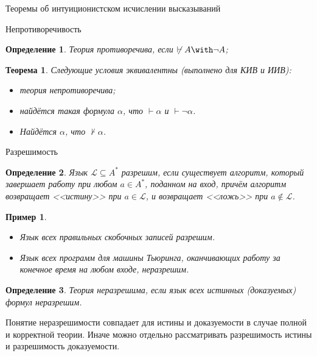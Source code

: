 \documentclass[aspectratio=169]{beamer}
\begin{document}
\newtheorem{axiom}{Аксиома}
\newtheorem{exmprus}{Пример}
\newtheorem{defrus}{Определение}
\newtheorem{lemmarus}{Лемма}
\newtheorem{thmrus}{Теорема}

\begin{frame}{}
\begin{center}\Large Теоремы об интуиционистском исчислении высказываний\end{center}
\end{frame}

\begin{frame}{Непротиворечивость}
\begin{defrus}
Теория противоречива, если $\not\vdash A \with \neg A$;
\end{defrus}

\begin{thmrus}
Следующие условия эквивалентны (выполнено для КИВ и ИИВ):
\begin{itemize}
\item теория непротиворечива;
\item найдётся такая формула $\alpha$, что $\vdash\alpha$ и $\vdash\neg\alpha$.
\item Найдётся $\alpha$, что $\not\vdash\alpha$.
\end{itemize}
\end{thmrus}
\end{frame}

\begin{frame}{Разрешимость}
\begin{defrus}
Язык $\mathcal{L} \subseteq A^*$ разрешим, если существует алгоритм, который
завершает работу при любом $a \in A^*$, поданном на вход,
причём алгоритм возвращает <<истину>> при $a \in \mathcal{L}$, 
и возвращает <<ложь>> при $a \notin \mathcal{L}$.
\end{defrus}

\begin{exmprus}
\begin{itemize}
\item Язык всех правильных скобочных записей разрешим.
\item Язык всех программ для машины Тьюринга, оканчивающих работу за конечное время на любом входе, неразрешим.
\end{itemize}
\end{exmprus}

\begin{defrus}
Теория неразрешима, если язык всех истинных (доказуемых) формул неразрешим.
\end{defrus}

Понятие неразрешимости совпадает для истины и доказуемости в случае полной и корректной теории.
Иначе можно отдельно рассматривать разрешимость истины и разрешимость доказуемости.
\end{frame}
\end{document}

